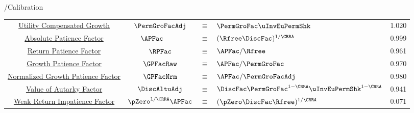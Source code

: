 \documentclass[\econtexRoot/BufferStockTheory]{subfiles}
\providecommand{\TblBox}{}\providecommand{\TblName}{}
\renewcommand{\TblName}{Calibration}
\begin{document}
\begin{verbatimwrite}{\TableDir/\TblName}
\begin{table}
{\begin{tabular}{|c|ccl|c|}
        \href{https://\owner.github.io/BufferStockTheory\#PermGroFacAdj}{Utility Compensated Growth}                     & $\PermGroFacAdj $ & $\equiv$ & $ \PermGroFac \uInvEuPermShk$        & 1.020 \\
        \href{https://\owner.github.io/BufferStockTheory\#APFacDefn}{Absolute Patience Factor}                    & $\APFac_{\phantom{\Rfree}} $ & $\equiv$ & $ (\Rfree \DiscFac)^{1/\CRRA}$                & 0.999 \\
        \href{https://\owner.github.io/BufferStockTheory\#RPFacDefn}{Return Patience Factor}                      & $\RPFac$ & $\equiv$ & $\APFac/\Rfree $     & 0.961 \\
        \href{https://\owner.github.io/BufferStockTheory\#GPFacRawDefn}{\phantom{Normalized }Growth Patience Factor}    & $\GPFacRaw$ & $\equiv$ & $\APFac/\PermGroFac $      & 0.970 \\
        \href{https://\owner.github.io/BufferStockTheory\#GPFacRawRawDefn}{Normalized Growth Patience Factor}                      & $\GPFacNrm$ & $\equiv$ & $ \APFac/\PermGroFacAdj$& 0.980 \\
        \href{https://\owner.github.io/BufferStockTheory\#VAFacDefn}{Value of Autarky Factor}         & $\DiscAltuAdj $ & $\equiv$ & $ \DiscFac \PermGroFac^{1-\CRRA}\uInvEuPermShk^{1-\CRRA}$       & 0.941 \\ 
        \href{https://\owner.github.io/BufferStockTheory\#WRICCond}{Weak Return Impatience Factor}         & $\pZero^{1/\CRRA} \APFac $ & $\equiv$ & $ (\pZero \DiscFac \Rfree)^{1/\CRRA}$       & 0.071 \\ \hline
      \end{tabular}
    } %

    \settowidth\TableWidth{\usebox{\TblBox}}
    \savebox{\TblShrunkBox}{
      \settowidth{\TblShrunk}{\usebox{\TblBox}}
      \resizebox{0.9\textwidth}{!}{\begin{minipage}{\TblShrunk}
          \usebox{\TblBox}
        \end{minipage}}
    }

    \usebox{\TblShrunkBox}


  \end{table}
\end{verbatimwrite}
\clearpage

\end{document}
